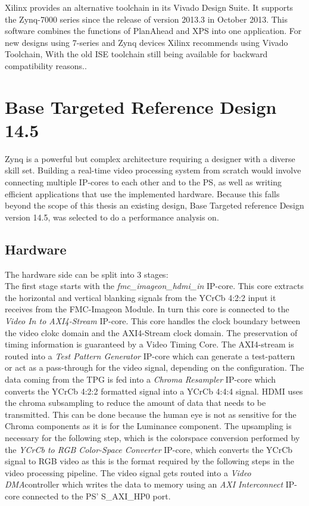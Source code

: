 Xilinx provides an alternative toolchain in its Vivado Design Suite. It supports the Zynq-7000 series since the release of version 2013.3 in October 2013. This software combines the functions of PlanAhead and XPS into one application. For new designs using 7-series and Zynq devices Xilinx recommends using Vivado Toolchain, With the old ISE toolchain still being available for backward compatibility reasons.\cite{isereleasenotes}.


\section{Base Targeted Reference Design 14.5}
Zynq is a powerful but complex architecture requiring a designer with a diverse skill set. Building a real-time video processing system from scratch would involve connecting multiple IP-cores to each other and to the PS, as well as writing efficient applications that use the implemented hardware. Because this falls beyond the scope of this thesis an existing design, Base Targeted reference Design version 14.5, was selected to do a performance analysis on.

\subsection{Hardware}
The hardware side can be split into 3 stages:\\ 

The first stage starts with the \emph{fmc\_imageon\_hdmi\_in} IP-core. This core extracts the horizontal and vertical blanking signals from the YCrCb 4:2:2 input it receives from the FMC-Imageon Module. In turn this core is connected to the \emph{Video In to AXI4-Stream} IP-core. This core handles the clock boundary between the video clokc domain and the AXI4-Stream clock domain. The preservation of timing information is guaranteed by a Video Timing Core. The AXI4-stream is routed into a \emph{Test Pattern Generator} IP-core which can generate a test-pattern or act as a pass-through for the video signal, depending on the configuration. The data coming from the TPG is fed into a \emph{Chroma Resampler} IP-core which converts the YCrCb 4:2:2 formatted signal into a YCrCb 4:4:4 signal. HDMI uses the chroma subsampling to reduce the amount of data that needs to be transmitted. This can be done because the human eye is not as sensitive for the Chroma components as it is for the Luminance component. The upsampling is necessary for the following step, which is the colorspace conversion performed by the \emph{YCrCb to RGB Color-Space Converter} IP-core, which converts the YCrCb signal to RGB video as this is the format required by the following steps in the video processing pipeline. The video signal gets routed into a \emph{Video DMA}controller which writes the data to memory using an \emph{AXI Interconnect} IP-core connected to the PS' S\_AXI\_HP0 port.\\

